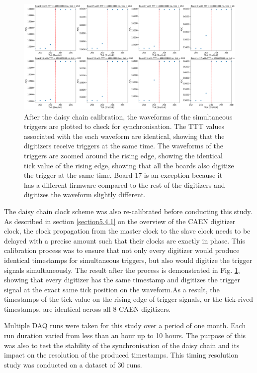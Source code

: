 \begin{figure}[htbp!] 
\centering    
\includegraphics[width=1.0\textwidth]{daisychain_calib}
\caption[daisychainCALIB]{
After the daisy chain calibration, the waveforms of the simultaneous triggers are plotted to check for synchronisation.
The TTT values associated with the each waveform are identical, showing that the digitizers receive triggers at the same time.
The waveforms of the triggers are zoomed around the rising edge, showing the identical tick value of the rising edge, showing that all the boards also digitize the trigger at the same time.
Board 17 is an exception because it has a different firmware compared to the rest of the digitizers and digitizes the waveform slightly different.
}
\label{fig:daisychainCALIB}
\end{figure}

The daisy chain clock scheme was also re-calibrated before conducting this study.
As described in section \ref{section5.4.1} on the overview of the CAEN digitizer clock, the clock propagation from the master clock to the slave clock needs to be delayed with a precise amount such that their clocks are exactly in phase.
This calibration process was to ensure that not only every digitizer would produce identical timestamps for simultaneous triggers, but also would digitize the trigger signals simultaneously.
The result after the process is demonstrated in Fig. \ref{fig:daisychainCALIB}, showing that every digitizer has the same timestamp and digitizes the trigger signal at the exact same tick position on the waveform.As a result, the timestamps of the tick value on the rising edge of trigger signals, or the tick-rived timestamps, are identical across all 8 CAEN digitizers.

Multiple DAQ runs were taken for this study over a period of one month.
Each run duration varied from less than an hour up to 10 hours.
The purpose of this was also to test the stability of the synchronisation of the daisy chain and its impact on the resolution of the produced timestamps.
This timing resolution study was conducted on a dataset of 30 runs.

